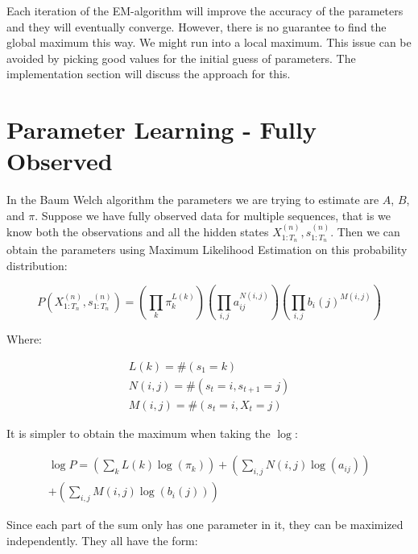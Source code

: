 Each iteration of the EM-algorithm will improve the accuracy of the parameters and they will eventually converge. However, there is no guarantee to find the global maximum this way. We might run into a local maximum. This issue can be avoided by picking good values for the initial guess of parameters. The implementation section will discuss the approach for this.

\section{Parameter Learning - Fully Observed}

In the Baum Welch algorithm the parameters we are trying to estimate are $A$, $B$, and $\pi$. Suppose we have fully observed data for multiple sequences, that is we know both the observations and all the hidden states $X_{1: T_{n}}^{(n)}, s_{1: T_{n}}^{(n)}$. Then we can obtain the parameters using Maximum Likelihood Estimation on this probability distribution:


\begin{equation}
  P(X_{1: T_{n}}^{(n)}, s_{1: T_{n}}^{(n)})=\left(\prod_{k} \pi_{k}^{L(k)}\right)\left(\prod_{i, j} a_{i j}^{N(i, j)}\right)\left(\prod_{i, j} b_{i}(j)^{M(i, j)}\right) 
\end{equation}

Where:

\begin{equation}
  \begin{array}{c}
L(k)=\#\left(s_{1}=k\right) \\
N(i, j)=\#\left(s_{t}=i, s_{t+1}=j\right) \\
M(i, j)=\#\left(s_{t}=i, X_{t}=j\right)
\end{array} 
\end{equation}

It is simpler to obtain the maximum when taking the $\log$:

\begin{equation}
\begin{split}
  \log P=\left(\sum_{k} L(k) \log \left(\pi_{k}\right)\right)+\left(\sum_{i, j} N(i, j) \log \left(a_{i j}\right)\right)  \\
   +\left(\sum_{i, j} M(i, j) \log \left(b_{i}(j)\right)\right) 
\end{split}
\end{equation}

Since each part of the sum only has one parameter in it, they can be maximized independently. They all have the form: 

